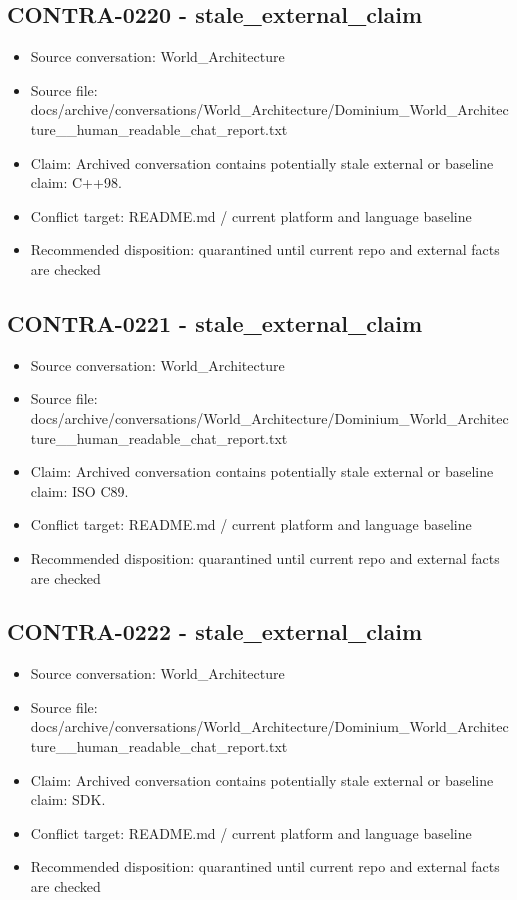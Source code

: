 \documentclass[11pt,a4paper]{report}
\begin{document}
\subsection{CONTRA-0220 - stale\_external\_claim}

\begin{itemize}
\item Source conversation: World\_Architecture
\item Source file: docs/archive/conversations/World\_Architecture/Dominium\_World\_Architecture\_\_human\_readable\_chat\_report.txt
\item Claim: Archived conversation contains potentially stale external or baseline claim: C++98.
\item Conflict target: README.md / current platform and language baseline
\item Recommended disposition: quarantined until current repo and external facts are checked
\end{itemize}

\subsection{CONTRA-0221 - stale\_external\_claim}

\begin{itemize}
\item Source conversation: World\_Architecture
\item Source file: docs/archive/conversations/World\_Architecture/Dominium\_World\_Architecture\_\_human\_readable\_chat\_report.txt
\item Claim: Archived conversation contains potentially stale external or baseline claim: ISO C89.
\item Conflict target: README.md / current platform and language baseline
\item Recommended disposition: quarantined until current repo and external facts are checked
\end{itemize}

\subsection{CONTRA-0222 - stale\_external\_claim}

\begin{itemize}
\item Source conversation: World\_Architecture
\item Source file: docs/archive/conversations/World\_Architecture/Dominium\_World\_Architecture\_\_human\_readable\_chat\_report.txt
\item Claim: Archived conversation contains potentially stale external or baseline claim: SDK.
\item Conflict target: README.md / current platform and language baseline
\item Recommended disposition: quarantined until current repo and external facts are checked
\end{itemize}
\end{document}
